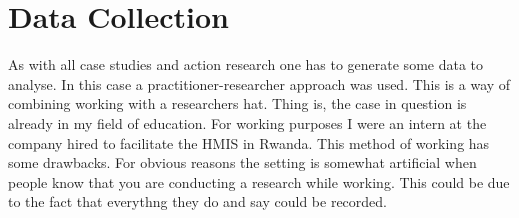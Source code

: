 \section{Data Collection}
As with all case studies and action research one has to generate some data to analyse.
In this case a practitioner-researcher approach was used\cite{13}. This is a way of combining working with a researchers hat.
Thing is, the case in question is already in my field of education. For working purposes I were an intern at the company hired to facilitate the HMIS in Rwanda.
This method of working has some drawbacks.
For obvious reasons the setting is somewhat artificial when people know that you are conducting a research while working.
This could be due to the fact that everythng they do and say could be recorded.

